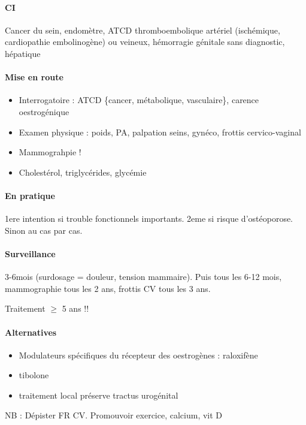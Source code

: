 \documentclass[11pt]{article}
\begin{document}
\paragraph{CI}
\label{sec:orgc80f5a7}
Cancer du sein, endomètre, ATCD thromboembolique artériel (ischémique,
cardiopathie embolinogène) ou veineux, hémorragie génitale sans diagnostic, hépatique

\paragraph{Mise en route}
\label{sec:org8fabcfe}
\begin{itemize}
\item Interrogatoire : ATCD \{cancer, métabolique, vasculaire\}, carence oestrogénique
\item Examen physique : poids, PA, palpation seins, gynéco, frottis cervico-vaginal
\item Mammograhpie !
\item Cholestérol, triglycérides, glycémie
\end{itemize}

\paragraph{En pratique}
\label{sec:org1c4f87d}
1ere intention si trouble fonctionnels importants. 2eme si risque
d'ostéoporose. Sinon au cas par cas.

\paragraph{Surveillance}
\label{sec:org6217359}
3-6mois (surdosage = douleur, tension mammaire). Puis tous les 6-12 mois,
mammographie tous les 2 ans, frottis CV tous les 3 ans.

Traitement \(\ge\) 5 ans !!

\paragraph{Alternatives}
\label{sec:org8989c64}
\begin{itemize}
\item Modulateurs spécifiques du récepteur des oestrogènes : raloxifène
\item tibolone
\item traitement local préserve tractus urogénital
\end{itemize}

NB : Dépister FR CV. Promouvoir exercice, calcium, vit D
\end{document}
